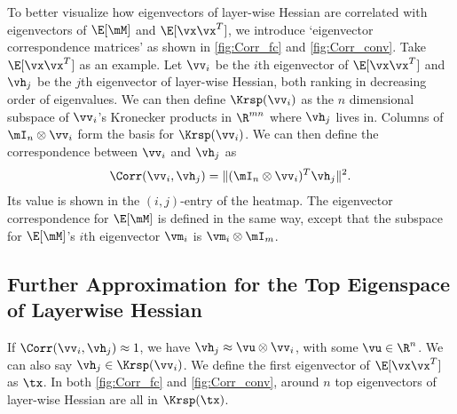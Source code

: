 To better visualize how eigenvectors of layer-wise Hessian are correlated with eigenvectors of $\E[\mM]$ and $\E[\vx\vx^T]$, we introduce `eigenvector correspondence matrices' as shown in \cref{fig:Corr_fc} and \cref{fig:Corr_conv}. Take $\E[\vx\vx^T]$ as an example. Let $\vv_i$ be the $i$th eigenvector of $\E[\vx\vx^T]$ and $\vh_j$ be the $j$th eigenvector of layer-wise Hessian, both ranking in decreasing order of eigenvalues. We can then define $\Krsp(\vv_i)$ as the $n$ dimensional subspace of $\vv_i$'s Kronecker products in $\R^{mn}$ where $\vh_j$ lives in. Columns of $\mI_n \otimes \vv_i$ form the basis for $\Krsp(\vv_i)$. We can then define the correspondence between $\vv_i$ and $\vh_j$ as
\begin{equation}
    \Corr(\vv_i, \vh_j) = \|(\mI_n \otimes \vv_i)^T\vh_j\|^2.
\end{equation}
Its value is shown in the $(i,j)$-entry of the heatmap. The eigenvector correspondence for $\E[\mM]$ is defined in the same way, except that the subspace for $\E[\mM]$'s $i$th eigenvector $\vm_i$ is $\vm_i \otimes \mI_m$.

\subsection{Further Approximation for the Top Eigenspace of Layerwise Hessian}
\label{sec:approx_top_eig}
If $\Corr(\vv_i, \vh_j) \approx 1$, we have $\vh_j \approx \vu \otimes \vv_i$, with some $\vu \in \R^n$. We can also say $\vh_j \in \Krsp(\vv_i)$. We define the first eigenvector of $\E[\vx\vx^T]$ as $\tx$. In both \cref{fig:Corr_fc} and \cref{fig:Corr_conv}, around $n$ top eigenvectors of layer-wise Hessian are all in $\Krsp(\tx)$.

